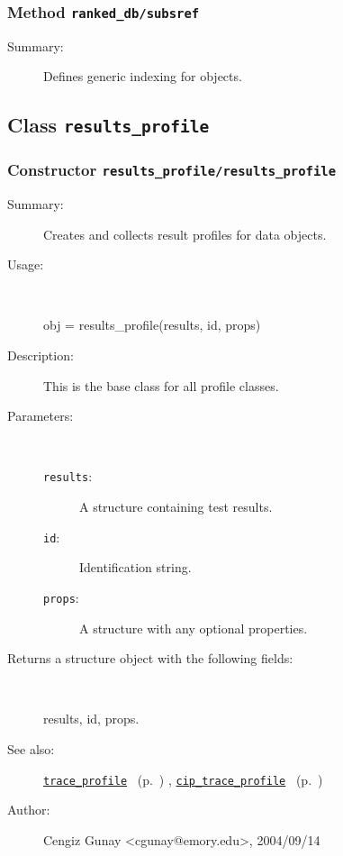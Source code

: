 \subsubsection[Method \texttt{subsref}]{Method \texttt{ranked\_db/subsref}}%
%
\label{ref_ranked_db__subsref}%
\hypertarget{ref_ranked_db__subsref}{}%
\begin{description}
\item[Summary:]Defines generic indexing for objects.
%
%
%
%
%
%
%
%
\end{description}
\methodline%
\subsection{Class \texttt{results\_profile}}%
%
\label{ref_results_profile}%
\hypertarget{ref_results_profile}{}%
\subsubsection[Constructor \texttt{results\_profile}]{Constructor \texttt{results\_profile/results\_profile}}%
%
\label{ref_results_profile__results_profile}%
\hypertarget{ref_results_profile__results_profile}{}%
\begin{description}
\item[Summary:]Creates and collects result profiles for data objects.
%
\item[Usage:]~%
\begin{lyxcode}%
obj = results\_profile(results, id, props)
%
\end{lyxcode}%
%
\item[Description:]%
This is the base class for all profile classes.
\item[Parameters:]~
\begin{description}%
\item[\texttt{results}:]
 A structure containing test results.
\item[\texttt{id}:]
 Identification string.
\item[\texttt{props}:]
 A structure with any optional properties.
\end{description}%
%
\item[Returns a structure object with the following fields:
]~

	results, id, props.
%
%
\item[See also:]%
\hyperlink{ref_trace_profile}{\texttt{trace\_profile}}%
\ (p.~\pageref{ref_trace_profile})%
%
, \hyperlink{ref_cip_trace_profile}{\texttt{cip\_trace\_profile}}%
\ (p.~\pageref{ref_cip_trace_profile})%
%
%
\item[Author:]%
Cengiz Gunay <cgunay@emory.edu>, 2004/09/14
%
\end{description}
\methodline%
